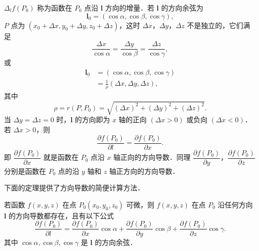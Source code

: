 $\Delta_{l}f(P_{0})$ 称为函数在 $P_{0}$ 点沿 $\bm{l}$ 方向的增量．若 $\bm{l}$ 的方向余弦为
\[
\bm{l}_{0}=(\cos\alpha,\cos\beta,\cos\gamma),
\]
$P$ 点为 $(x_{0}+\Delta x,y_{0}+\Delta y,z_{0}+\Delta z)$，这时 $\Delta x$，$\Delta y$，$\Delta z$ 不是独立的，它们满足
\[
\frac{\Delta x}{\cos\alpha}=\frac{\Delta y}{\cos\beta}=\frac{\Delta z}{\cos\gamma},
\]
或
\[
\begin{aligned}
\bm{l}_{0}&=(\cos\alpha,\cos\beta,\cos\gamma)\\
&=\frac{1}{\rho}(\Delta x,\Delta y,\Delta z),
\end{aligned}
\]
其中
\[
\rho=r(P,P_{0})=\sqrt{(\Delta x)^{2}+(\Delta y)^{2}+(\Delta z)^{2}}.
\]
当 $\Delta y=\Delta z=0$ 时，$\bm{l}$ 的方向即为 $x$ 轴的正向 $(\Delta x>0)$ 或负向 $(\Delta x<0)$．若 $\Delta x>0$，则
\[
\frac{\partial f(P_{0})}{\partial l}=\frac{\partial f(P_{0})}{\partial x}.
\]
即 $\dfrac{\partial f(P_{0})}{\partial x}$ 就是函数在 $P_{0}$ 点沿 $x$ 轴正向的方向导数．同理 $\dfrac{\partial f(P_{0})}{\partial y}$，$\dfrac{\partial f(P_{0})}{\partial z}$ 分别是函数在 $P_{0}$ 点的沿 $y$ 轴和 $z$ 轴正方向的方向导数．

下面的定理提供了方向导数的简便计算方法．

\begin{theorem}\label{thm:16-6}
若函数 $f(x,y,z)$ 在点 $P_{0}(x_{0},y_{0},z_{0})$ 可微，则 $f(x,y,z)$ 在点 $P_{0}$ 沿任何方向 $\bm{l}$ 的方向导数都存在，且有以下公式
\[
\frac{\partial f(P_{0})}{\partial l}=\frac{\partial f(P_{0})}{\partial x}\cos\alpha+\frac{\partial f(P_{0})}{\partial y}\cos\beta+\frac{\partial f(P_{0})}{\partial z}\cos\gamma.
\]
其中 $\cos\alpha,\cos\beta,\cos\gamma$ 是 $\bm{l}$ 的方向余弦．
\end{theorem}

